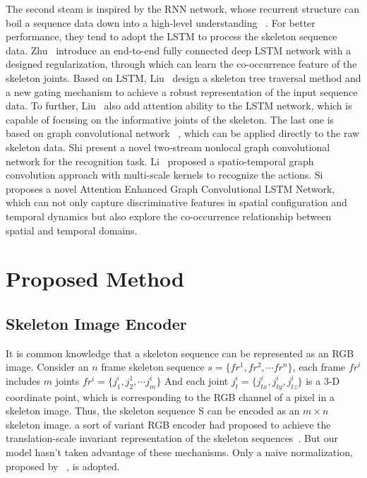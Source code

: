 \documentclass{bmvc2k}
\begin{document}
The second steam is inspired by the RNN network, whose recurrent structure can boil a sequence data down into a high-level understanding ~\cite{olah2016attention}. For better performance, they tend to adopt the LSTM to process the skeleton sequence data. Zhu~\cite{zhu2016co} introduce an end-to-end fully connected deep LSTM network with a designed regularization, through which can learn the co-occurrence feature of the skeleton joints. Based on LSTM, Liu~\cite{liu2018skeleton} design a skeleton tree traversal method and a new gating mechanism to achieve a robust representation of the input sequence data. To further, Liu~\cite{liu2018skeleton_13} also add attention ability to the LSTM network, which is capable of focusing on the informative joints of the skeleton.
The last one is based on graph convolutional network ~\cite{bruna2013spectral}, which can be applied directly to the raw skeleton data. Shi\cite{shi2018non-local} present a novel two-stream nonlocal graph convolutional network for the recognition task. Li~\cite{li2018spatio} proposed a spatio-temporal graph convolution approach with multi-scale kernels to recognize the actions. Si\cite{si2019attention} proposes a novel Attention Enhanced Graph Convolutional LSTM Network, which can not only capture discriminative features in spatial configuration and temporal dynamics but also explore the co-occurrence relationship between spatial and temporal domains.
\section{Proposed Method}
\subsection*{Skeleton Image Encoder}
It is common knowledge that a skeleton sequence can be represented as an RGB image. Consider an $n$ frame skeleton sequence $s=\{ fr^1,fr^2,\cdots fr^n\}$, each frame $fr^i$ includes $m$ joints $fr^i =\{j^i_1,j^1_2,\cdots j^i_m\}$ And each joint $j^i_t=\{j^i_{tx},j^i_{ty},j^i_{tz}\}$  is a 3-D coordinate point, which is corresponding to the RGB channel of a pixel in a skeleton image. Thus, the skeleton sequence S can be encoded as an $m\times n$ skeleton image. a sort of variant RGB encoder had proposed to achieve the translation-scale invariant representation of the skeleton sequences~\cite{liu2017enhanced,ke2017new}. But our model hasn’t taken advantage of these mechanisms. Only a naive normalization, proposed by ~\cite{chen2015utd}, is adopted.
\end{document}
